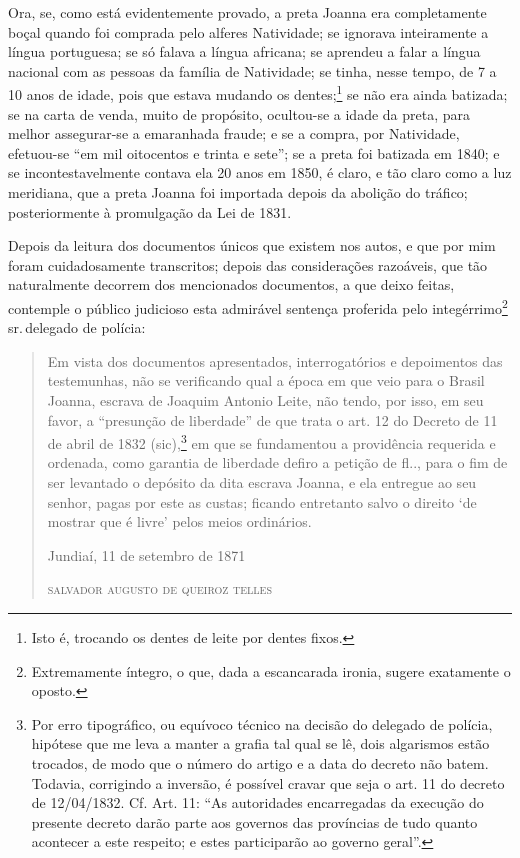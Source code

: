 Ora, se, como está evidentemente provado, a preta Joanna era
completamente boçal quando foi comprada pelo alferes Natividade; se
ignorava inteiramente a língua portuguesa; se só falava a língua
africana; se aprendeu a falar a língua nacional com as pessoas da
família de Natividade; se tinha, nesse tempo, de 7 a 10 anos de idade,
pois que estava mudando os dentes;\footnote{ Isto é, trocando os dentes
  de leite por dentes fixos.} se não era ainda batizada; se na carta de
venda, muito de propósito, ocultou-se a idade da preta, para melhor
assegurar-se a emaranhada fraude; e se a compra, por Natividade,
efetuou-se ``em mil oitocentos e trinta e sete''; se a preta foi batizada
em 1840; e se incontestavelmente contava ela 20 anos em 1850, é claro, e
tão claro como a luz meridiana, que a preta Joanna foi importada depois
da abolição do tráfico; posteriormente à promulgação da Lei de 1831.

Depois da leitura dos documentos únicos que existem nos autos, e que por
mim foram cuidadosamente transcritos; depois das considerações
razoáveis, que tão naturalmente decorrem dos mencionados documentos, a
que deixo feitas, contemple o público judicioso esta admirável sentença
proferida pelo integérrimo\footnote{ Extremamente íntegro, o que, dada
  a escancarada ironia, sugere exatamente o oposto.} sr.\,delegado de
polícia:

\begin{quote}
Em vista dos documentos apresentados, interrogatórios e depoimentos das
testemunhas, não se verificando qual a época em que veio para o Brasil
Joanna, escrava de Joaquim Antonio Leite, não tendo, por isso, em seu
favor, a ``presunção de liberdade'' de que trata o art. 12 do Decreto de
11 de abril de 1832 (sic),\footnote{ Por erro tipográfico, ou equívoco
  técnico na decisão do delegado de polícia, hipótese que me leva a
  manter a grafia tal qual se lê, dois algarismos estão trocados, de
  modo que o número do artigo e a data do decreto não batem. Todavia,
  corrigindo a inversão, é possível cravar que seja o art. 11 do decreto
  de 12/04/1832. Cf. Art. 11: ``As autoridades encarregadas da execução
  do presente decreto darão parte aos governos das províncias de tudo
  quanto acontecer a este respeito; e estes participarão ao governo
  geral''.} em que se fundamentou a providência requerida e ordenada,
como garantia de liberdade defiro a petição de fl.., para o fim de ser
levantado o depósito da dita escrava Joanna, e ela entregue ao seu
senhor, pagas por este as custas; ficando entretanto salvo o direito `de
mostrar que é livre' pelos meios ordinários.

\begin{flushright}
Jundiaí, 11 de setembro de 1871

\textsc{salvador augusto de queiroz telles}
\end{flushright}
\end{quote}


